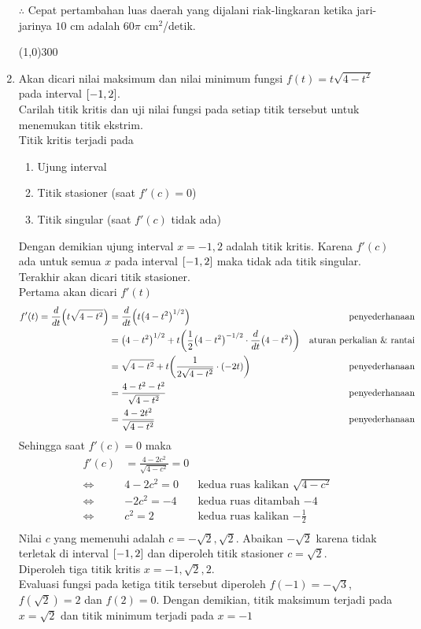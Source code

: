 \begin{enumerate}[leftmargin=*, label={\arabic*}.]
$\therefore$ Cepat pertambahan luas daerah yang dijalani riak-lingkaran ketika 
jari-jarinya $10$ cm adalah $60\pi$ cm$^{2}$/detik.
\begin{center}
    \line(1,0){300}
\end{center}

\item 
Akan dicari nilai maksimum dan nilai minimum fungsi $f(t)=t\sqrt{4-t^{2}}$ pada 
interval $\cic*{-1,2}$.\\
Carilah titik kritis dan uji nilai fungsi pada setiap titik tersebut untuk menemukan 
titik ekstrim.\\
Titik kritis terjadi pada
\begin{enumerate}[label={\arabic*})]
    \item Ujung interval
    \item Titik stasioner (saat $f'(c)=0$)
    \item Titik singular (saat $f'(c)$ tidak ada)
\end{enumerate}
Dengan demikian ujung interval $x=-1,2$ adalah titik kritis. Karena $f'(c)$ ada 
untuk semua $x$ pada interval $\cic*{-1,2}$ maka tidak ada titik singular. Terakhir akan 
dicari titik stasioner.\\
Pertama akan dicari $f'(t)$ 
\begin{align*}
    f'(t) = \drv{t}{t\sqrt{4-t^{2}}} 
    &= \drv{t}{t\brk*{4-t^{2}}^{1/2}}
    &\text{penyederhanaan}\\
    &= \brk*{4-t^2}^{1/2}+t\brk*{\frac{1}{2}\brk*{4-t^{2}}^{-1/2}\cdot\drv{t}{4-t^{2}}}
    &\text{aturan perkalian \& rantai}\\
    &= \sqrt{4-t^{2}}+t\brk*{\frac{1}{2\sqrt{4-t^{2}}}\cdot (-2t)}
    &\text{penyederhanaan}\\
    &= \frac{4-t^{2}-t^{2}}{\sqrt{4-t^{2}}}
    &\text{penyederhanaan}\\
    &= \frac{4-2t^{2}}{\sqrt{4-t^{2}}}
    &\text{penyederhanaan}
\end{align*}
Sehingga saat $f'(c)=0$ maka
\begin{align*}
    f'(c) &= \frac{4-2c^{2}}{\sqrt{4-c^{2}}} = 0\\
    \iff &4-2c^{2} = 0
    &\text{kedua ruas kalikan $\sqrt{4-c^{2}}$}\\
    \iff &-2c^{2} = -4
    &\text{kedua ruas ditambah $-4$}\\
    \iff &c^2 = 2
    &\text{kedua ruas kalikan $-\frac{1}{2}$}\\
\end{align*}
Nilai $c$ yang memenuhi adalah $c=-\sqrt{2}, \sqrt{2}$. Abaikan $-\sqrt{2}$ karena 
tidak terletak di interval $\cic{-1,2}$ dan diperoleh titik stasioner 
$c = \sqrt{2}$.\\
Diperoleh tiga titik kritis $x = -1,\sqrt{2},2$.\\
Evaluasi fungsi pada ketiga titik tersebut diperoleh $f(-1) = -\sqrt{3}$, 
$f(\sqrt{2})=2$ dan $f(2) = 0$. Dengan demikian, titik maksimum terjadi pada 
$x = \sqrt{2}$ dan titik minimum terjadi pada $x = -1$


\end{enumerate}
